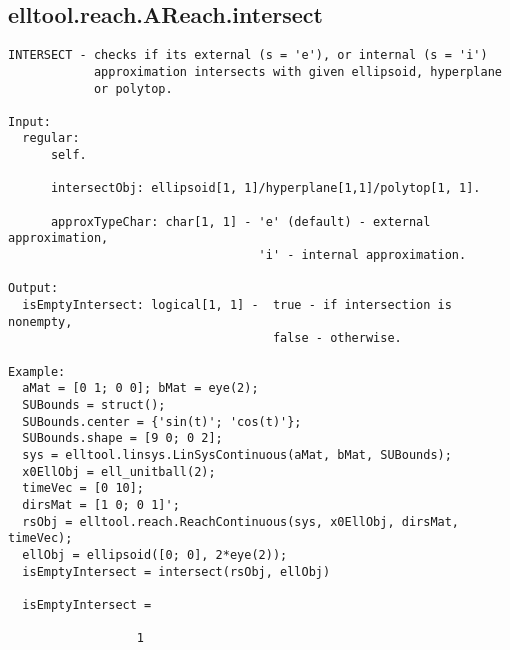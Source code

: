 \subsection{\texorpdfstring{elltool.reach.AReach.intersect}{intersect}}\label{method:elltool.reach.AReach.intersect}
\begin{verbatim}
INTERSECT - checks if its external (s = 'e'), or internal (s = 'i')
            approximation intersects with given ellipsoid, hyperplane
            or polytop.

Input:
  regular:
      self.

      intersectObj: ellipsoid[1, 1]/hyperplane[1,1]/polytop[1, 1].

      approxTypeChar: char[1, 1] - 'e' (default) - external approximation,
                                   'i' - internal approximation.

Output:
  isEmptyIntersect: logical[1, 1] -  true - if intersection is nonempty,
                                     false - otherwise.

Example:
  aMat = [0 1; 0 0]; bMat = eye(2);
  SUBounds = struct();
  SUBounds.center = {'sin(t)'; 'cos(t)'};
  SUBounds.shape = [9 0; 0 2];
  sys = elltool.linsys.LinSysContinuous(aMat, bMat, SUBounds);
  x0EllObj = ell_unitball(2);
  timeVec = [0 10];
  dirsMat = [1 0; 0 1]';
  rsObj = elltool.reach.ReachContinuous(sys, x0EllObj, dirsMat, timeVec);
  ellObj = ellipsoid([0; 0], 2*eye(2));
  isEmptyIntersect = intersect(rsObj, ellObj)

  isEmptyIntersect =

                  1
\end{verbatim}

